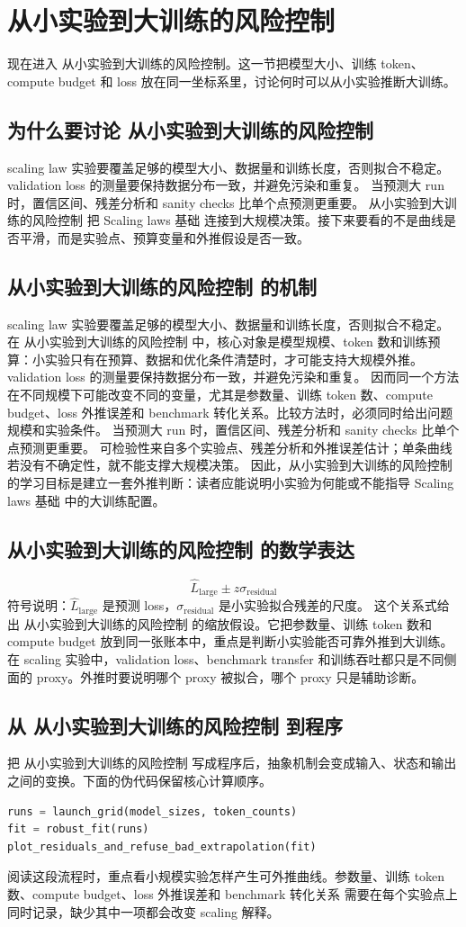 \documentclass[a4paper]{article}
\begin{document}
\section{从小实验到大训练的风险控制}
现在进入 从小实验到大训练的风险控制。这一节把模型大小、训练 token、compute budget 和 loss 放在同一坐标系里，讨论何时可以从小实验推断大训练。
\subsection{为什么要讨论 从小实验到大训练的风险控制}
scaling law 实验要覆盖足够的模型大小、数据量和训练长度，否则拟合不稳定。
validation loss 的测量要保持数据分布一致，并避免污染和重复。
当预测大 run 时，置信区间、残差分析和 sanity checks 比单个点预测更重要。
从小实验到大训练的风险控制 把 Scaling laws 基础 连接到大规模决策。接下来要看的不是曲线是否平滑，而是实验点、预算变量和外推假设是否一致。
\subsection{从小实验到大训练的风险控制 的机制}
scaling law 实验要覆盖足够的模型大小、数据量和训练长度，否则拟合不稳定。 在 从小实验到大训练的风险控制 中，核心对象是模型规模、token 数和训练预算：小实验只有在预算、数据和优化条件清楚时，才可能支持大规模外推。
validation loss 的测量要保持数据分布一致，并避免污染和重复。 因而同一个方法在不同规模下可能改变不同的变量，尤其是参数量、训练 token 数、compute budget、loss 外推误差和 benchmark 转化关系。比较方法时，必须同时给出问题规模和实验条件。
当预测大 run 时，置信区间、残差分析和 sanity checks 比单个点预测更重要。 可检验性来自多个实验点、残差分析和外推误差估计；单条曲线若没有不确定性，就不能支撑大规模决策。
因此，从小实验到大训练的风险控制 的学习目标是建立一套外推判断：读者应能说明小实验为何能或不能指导 Scaling laws 基础 中的大训练配置。
\subsection{从小实验到大训练的风险控制 的数学表达}
\[\hat L_{\text{large}}\pm z\sigma_{\text{residual}}\]
符号说明：\(\hat L_{\text{large}}\) 是预测 loss，\(\sigma_{\text{residual}}\) 是小实验拟合残差的尺度。
这个关系式给出 从小实验到大训练的风险控制 的缩放假设。它把参数量、训练 token 数和 compute budget 放到同一张账本中，重点是判断小实验能否可靠外推到大训练。
在 scaling 实验中，validation loss、benchmark transfer 和训练吞吐都只是不同侧面的 proxy。外推时要说明哪个 proxy 被拟合，哪个 proxy 只是辅助诊断。
\subsection{从 从小实验到大训练的风险控制 到程序}
把 从小实验到大训练的风险控制 写成程序后，抽象机制会变成输入、状态和输出之间的变换。下面的伪代码保留核心计算顺序。
\begin{lstlisting}[language=Python]
runs = launch_grid(model_sizes, token_counts)
fit = robust_fit(runs)
plot_residuals_and_refuse_bad_extrapolation(fit)
\end{lstlisting}
阅读这段流程时，重点看小规模实验怎样产生可外推曲线。参数量、训练 token 数、compute budget、loss 外推误差和 benchmark 转化关系 需要在每个实验点上同时记录，缺少其中一项都会改变 scaling 解释。
\end{document}
